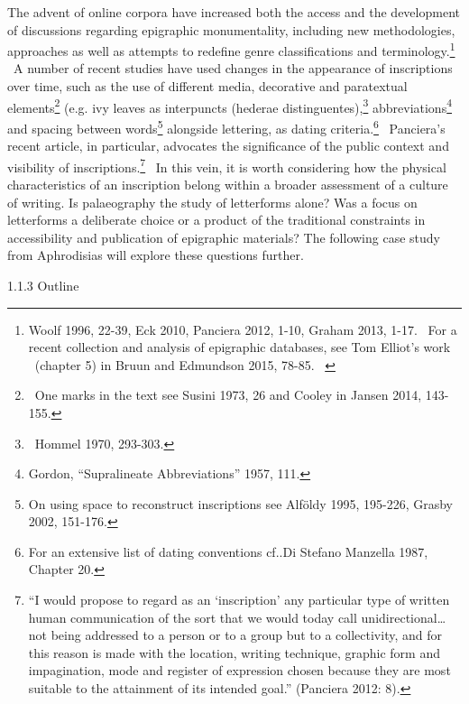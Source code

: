 \documentclass[amsthm,ebook]{saparticle}
\begin{document}
The advent of online corpora have increased both the access and the development of discussions regarding epigraphic
monumentality, including new methodologies, approaches as well as attempts to redefine genre classifications and
terminology.\footnote{ Woolf 1996, 22-39, Eck 2010, Panciera 2012, 1-10, Graham 2013, 1-17. \ For a recent collection
and analysis of epigraphic databases, see Tom Elliot’s work \ (chapter 5) in Bruun and Edmundson 2015, 78-85. \ } \ A
number of recent studies have used changes in the appearance of inscriptions over time, such as the use of different
media, decorative and paratextual elements\footnote{ \ One marks in the text see Susini 1973, 26 and Cooley in Jansen
2014, 143-155.} (e.g. ivy leaves as interpuncts (hederae distinguentes),\footnote{ \ Hommel 1970, 293-303. }
abbreviations\footnote{ Gordon, “Supralineate Abbreviations” 1957, 111.} and spacing between words\footnote{ On using
space to reconstruct inscriptions see Alföldy 1995, 195-226, Grasby 2002, 151-176.} alongside lettering, as dating
criteria.\footnote{ For an extensive list of dating conventions cf..Di Stefano Manzella 1987, Chapter 20. }
\ Panciera’s recent article, in particular, advocates the significance of the public context and visibility of
inscriptions.\footnote{ “I would propose to regard as an ‘inscription’ any particular type of written human
communication of the sort that we would today call unidirectional…not being addressed to a person or to a group but to
a collectivity, and for this reason is made with the location, writing technique, graphic form and impagination, mode
and register of expression chosen because they are most suitable to the attainment of its intended goal.” (Panciera
2012: 8).} \ In this vein, it is worth considering how the physical characteristics of an inscription belong within a
broader assessment of a culture of writing. Is palaeography the study of letterforms alone? Was a focus on letterforms
a deliberate choice or a product of the traditional constraints in accessibility and publication of epigraphic
materials? The following case study from Aphrodisias will explore these questions further. 


\bigskip

1.1.3 Outline


\bigskip
\end{document}
